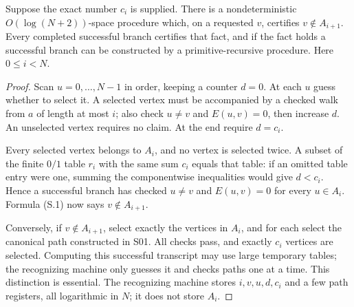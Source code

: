 \begin{lemma}
\label{thm:S07}
Suppose the exact number $c_i$ is supplied.  There is a nondeterministic
$O(\log(N+2))$-space procedure which, on a requested $v$, certifies
$v\notin A_{i+1}$.  Every completed successful branch certifies that
fact, and if the fact holds a successful branch can be constructed by a
primitive-recursive procedure.  Here $0\leq i<N$.
\end{lemma}
\begin{proof}
Scan $u=0,\ldots,N-1$ in order, keeping a counter $d=0$.
At each $u$ guess whether to select it.  A selected vertex must be
accompanied by a checked walk from $a$ of length at most $i$; also check
$u\ne v$ and $E(u,v)=0$, then increase $d$.  An unselected vertex
requires no claim.  At the end require $d=c_i$.

Every selected vertex belongs to $A_i$, and no vertex is selected twice.
A subset of the finite $0/1$ table $r_i$ with the same sum $c_i$ equals
that table: if an omitted table entry were one, summing the componentwise
inequalities would give $d<c_i$.  Hence a successful branch has checked
$u\ne v$ and $E(u,v)=0$ for every $u\in A_i$.  Formula (S.1) now says
$v\notin A_{i+1}$.

Conversely, if $v\notin A_{i+1}$, select exactly the vertices in
$A_i$, and for each select the canonical path constructed in S01.
All checks pass, and exactly $c_i$ vertices are selected.  Computing this
successful transcript may use large temporary tables; the recognizing
machine only guesses it and checks paths one at a time.  This distinction
is essential.  The recognizing machine stores $i,v,u,d,c_i$ and a few
path registers, all logarithmic in $N$; it does not store $A_i$.
\end{proof}

